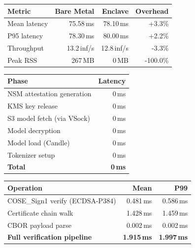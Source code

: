 \begin{tabular}{lrrr}
\hline
\textbf{Metric} & \textbf{Bare Metal} & \textbf{Enclave} & \textbf{Overhead} \\
\hline
Mean latency     & 75.58\,ms  & 78.10\,ms  & +3.3\% \\
P95 latency      & 78.30\,ms  & 80.00\,ms  & +2.2\% \\
Throughput       & 13.2\,inf/s & 12.8\,inf/s & -3.3\% \\
Peak RSS         & 267\,MB    & 0\,MB & -100.0\% \\
\hline
\end{tabular}

\begin{tabular}{lr}
\hline
\textbf{Phase} & \textbf{Latency} \\
\hline
NSM attestation generation & 0\,ms \\
KMS key release            & 0\,ms \\
S3 model fetch (via VSock) & 0\,ms \\
Model decryption           & 0\,ms \\
Model load (Candle)        & 0\,ms \\
Tokenizer setup            & 0\,ms \\
\hline
\textbf{Total}             & \textbf{0\,ms} \\
\hline
\end{tabular}


\begin{tabular}{lrr}
\hline
\textbf{Operation} & \textbf{Mean} & \textbf{P99} \\
\hline
COSE\_Sign1 verify (ECDSA-P384) & 0.481\,ms & 0.586\,ms \\
Certificate chain walk & 1.428\,ms & 1.459\,ms \\
CBOR payload parse & 0.002\,ms & 0.002\,ms \\
\textbf{Full verification pipeline} & \textbf{1.915\,ms} & \textbf{1.997\,ms} \\
\hline
\end{tabular}

